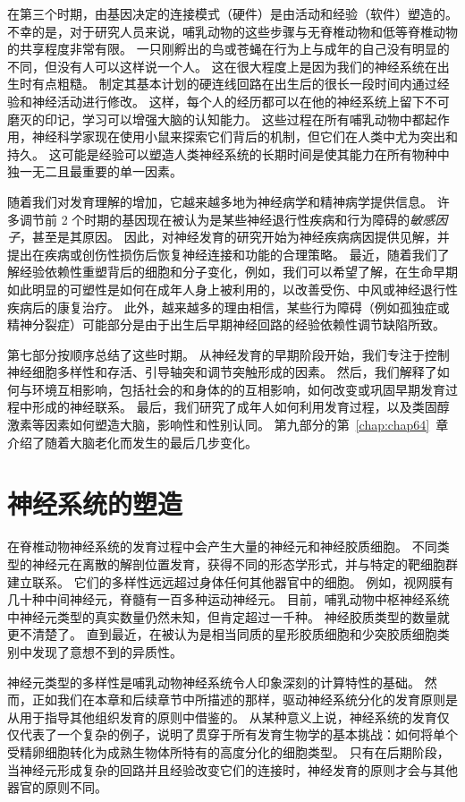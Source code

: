 在第三个时期，由基因决定的连接模式（硬件）是由活动和经验（软件）塑造的。
不幸的是，对于研究人员来说，哺乳动物的这些步骤与无脊椎动物和低等脊椎动物的共享程度非常有限。
一只刚孵出的鸟或苍蝇在行为上与成年的自己没有明显的不同，但没有人可以这样说一个人。
这在很大程度上是因为我们的神经系统在出生时有点粗糙。
制定其基本计划的硬连线回路在出生后的很长一段时间内通过经验和神经活动进行修改。
这样，每个人的经历都可以在他的神经系统上留下不可磨灭的印记，学习可以增强大脑的认知能力。
这些过程在所有哺乳动物中都起作用，神经科学家现在使用小鼠来探索它们背后的机制，但它们在人类中尤为突出和持久。
这可能是经验可以塑造人类神经系统的长期时间是使其能力在所有物种中独一无二且最重要的单一因素。


随着我们对发育理解的增加，它越来越多地为神经病学和精神病学提供信息。
许多调节前 2 个时期的基因现在被认为是某些神经退行性疾病和行为障碍的\textit{敏感因子}，甚至是其原因。
因此，对神经发育的研究开始为神经疾病病因提供见解，并提出在疾病或创伤性损伤后恢复神经连接和功能的合理策略。
最近，随着我们了解经验依赖性重塑背后的细胞和分子变化，例如，我们可以希望了解，在生命早期如此明显的可塑性是如何在成年人身上被利用的，以改善受伤、中风或神经退行性疾病后的康复治疗。
此外，越来越多的理由相信，某些行为障碍（例如孤独症或精神分裂症）可能部分是由于出生后早期神经回路的经验依赖性调节缺陷所致。


第七部分按顺序总结了这些时期。
从神经发育的早期阶段开始，我们专注于控制神经细胞多样性和存活、引导轴突和调节突触形成的因素。
然后，我们解释了如何与环境互相影响，包括社会的和身体的的互相影响，如何改变或巩固早期发育过程中形成的神经联系。
最后，我们研究了成年人如何利用发育过程，以及类固醇激素等因素如何塑造大脑，影响性和性别认同。
第九部分的第~\ref{chap:chap64}~章介绍了随着大脑老化而发生的最后几步变化。



\chapter{神经系统的塑造} \label{chap:chap45}

在脊椎动物神经系统的发育过程中会产生大量的神经元和神经胶质细胞。
不同类型的神经元在离散的解剖位置发育，获得不同的形态学形式，并与特定的靶细胞群建立联系。
它们的多样性远远超过身体任何其他器官中的细胞。
例如，视网膜有几十种中间神经元，脊髓有一百多种运动神经元。
目前，哺乳动物中枢神经系统中神经元类型的真实数量仍然未知，但肯定超过一千种。
神经胶质类型的数量就更不清楚了。
直到最近，在被认为是相当同质的星形胶质细胞和少突胶质细胞类别中发现了意想不到的异质性。


神经元类型的多样性是哺乳动物神经系统令人印象深刻的计算特性的基础。
然而，正如我们在本章和后续章节中所描述的那样，驱动神经系统分化的发育原则是从用于指导其他组织发育的原则中借鉴的。
从某种意义上说，神经系统的发育仅仅代表了一个复杂的例子，说明了贯穿于所有发育生物学的基本挑战：如何将单个受精卵细胞转化为成熟生物体所特有的高度分化的细胞类型。
只有在后期阶段，当神经元形成复杂的回路并且经验改变它们的连接时，神经发育的原则才会与其他器官的原则不同。


